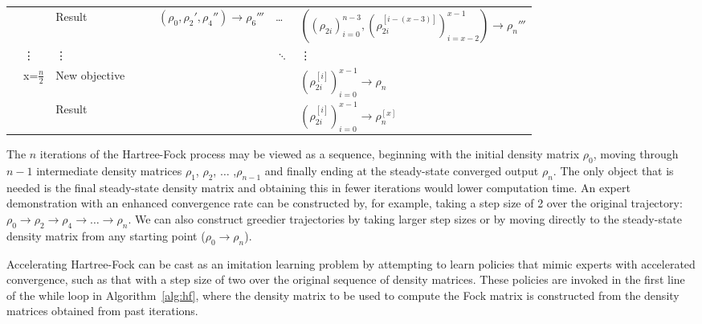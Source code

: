 \documentclass[twoside,11pt]{article}
\begin{document}
\begin{center}
\begin{table}[t]
{\begin{tabular}{|l|l|l|l|l|l|l|l|}
	&                 & Result &                 &                 & $(\rho_0,\rho_2',\rho_4'')  \rightarrow \rho_6'''$ &  \ldots & $((\rho_{2i})_{i=0}^{n-3} ,(\rho_{2i}^{[i-(x-3)]})_{i=x-2}^{x-1})\rightarrow \rho_{n}'''$      \\ \cline{2-8} 
	& \vdots      & \vdots      &                &                &                & $\ddots$ &   \vdots \\ \cline{2-8} 
	& \multirow{2}{*}{ x=$\frac{n}{2}$} & New objective         &                         &                          &                            &  & $(\rho_{2i}^{[i]})_{i=0}^{x-1} \rightarrow \rho_{n}$     \\ \cline{3-8} 
	&                & Result  &                &                &                &  & $(\rho_{2i}^{[i]})_{i=0}^{x-1}\rightarrow \rho_{n}^{[x]}$ \\ \hline
	\end{tabular}}
	\label{tab:DAgger}
	\end{table}
\end{center} 

The $n$ iterations of the Hartree-Fock process may be viewed as a sequence, beginning with the initial density matrix $\rho_0$, moving through $n-1$ intermediate density matrices $\rho_1$,  $\rho_2$,  $\ldots$ ,$\rho_{n-1}$ and finally ending at the steady-state converged output $\rho_{n}$. The only object that is needed is the final steady-state density matrix and obtaining this in fewer iterations would lower computation time. An expert demonstration with an enhanced convergence rate can be constructed by, for example, taking a step size of 2 over the original trajectory: $\rho_0 \rightarrow \rho_2 \rightarrow  \rho_4 \rightarrow  \ldots \rightarrow  \rho_{n}$. We can also construct greedier trajectories by taking larger step sizes or by moving directly to the steady-state density matrix from any starting point ($\rho_0 \rightarrow \rho_{n}$). 

Accelerating Hartree-Fock can be cast as an imitation learning problem by attempting to learn policies that mimic experts with accelerated convergence, such as that with a step size of two over the original sequence of density matrices. These policies are invoked in the first line of the while loop in Algorithm~\ref{alg:hf}, where the density matrix to be used to compute the Fock matrix is constructed from the density matrices obtained from past iterations. 
\end{document}
